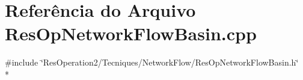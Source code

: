 \section{Referência do Arquivo Res\+Op\+Network\+Flow\+Basin.\+cpp}
\label{_res_op_network_flow_basin_8cpp}
{\ttfamily \#include \char`\"{}Res\+Operation2/\+Tecniques/\+Network\+Flow/\+Res\+Op\+Network\+Flow\+Basin.\+h\char`\"{}}\\*
